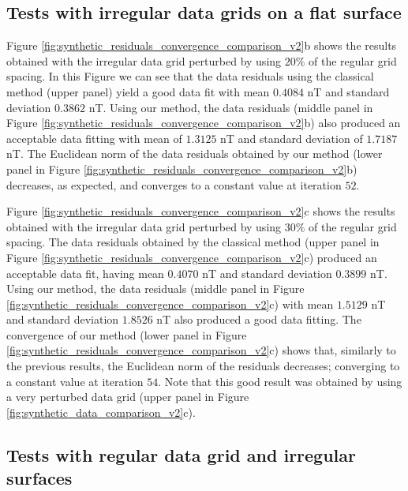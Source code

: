 \documentclass[manuscript,noblind]{geophysics}
\begin{document}
\subsection*{Tests with irregular data grids on a flat surface}

Figure \ref{fig:synthetic_residuals_convergence_comparison_v2}b shows the results obtained
with the irregular data grid perturbed by using $20\%$ of the regular grid spacing.
In this Figure we can see that the data residuals 
using the classical method (upper panel) yield a good data fit with mean $0.4084$ nT and standard
deviation $0.3862$ nT. 
Using our method, the data residuals (middle panel in Figure 
\ref{fig:synthetic_residuals_convergence_comparison_v2}b) also produced an acceptable data 
fitting with mean of  $1.3125$ nT and standard deviation of $1.7187$ nT. 
The Euclidean norm of the data residuals obtained by our method 
(lower panel in Figure \ref{fig:synthetic_residuals_convergence_comparison_v2}b) decreases, 
as expected, and converges to a constant value at iteration $52$. 

Figure \ref{fig:synthetic_residuals_convergence_comparison_v2}c shows the results obtained
with the irregular data grid perturbed by using $30\%$ of the regular grid spacing.
The data residuals 
obtained by the classical method (upper panel in Figure \ref{fig:synthetic_residuals_convergence_comparison_v2}c) produced an acceptable data fit, having mean 
$0.4070$ nT and standard deviation $0.3899$ nT.
Using our method, the data residuals (middle panel in Figure 
\ref{fig:synthetic_residuals_convergence_comparison_v2}c) with mean $1.5129$ nT and 
standard deviation $1.8526$ nT also produced a good data fitting.
The convergence of our method (lower panel in Figure 
\ref{fig:synthetic_residuals_convergence_comparison_v2}c) shows that, 
similarly to the previous results, the Euclidean norm of the residuals decreases; converging 
to a constant value at iteration $54$. Note that this good result was obtained by 
using a very perturbed data grid (upper panel in Figure \ref{fig:synthetic_data_comparison_v2}c).

\subsection*{Tests with regular data grid and irregular surfaces}
\end{document}

